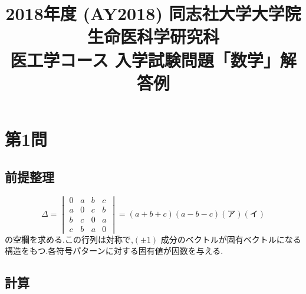 \documentclass[11pt,a4paper]{article}
\title{2018年度 (AY2018) 同志社大学大学院 生命医科学研究科\\
医工学コース 入学試験問題「数学」解答例}
\author{}
\date{}
\begin{document}
\maketitle
\vspace{-3em}

\section*{第1問}

\subsection*{前提整理}

\[
\Delta=\begin{vmatrix}0&a&b&c\\a&0&c&b\\b&c&0&a\\c&b&a&0\end{vmatrix}
=(a+b+c)(a-b-c)(\text{ア})(\text{イ})
\]
の空欄を求める.この行列は対称で,$(\pm1)$ 成分のベクトルが固有ベクトルになる
構造をもつ.各符号パターンに対する固有値が因数を与える.

\subsection*{計算}
\end{document}
